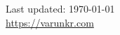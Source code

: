 \documentclass[10pt, letterpaper]{article}
\def\footerlink{https://varunkr.com}
\begin{document}
\begin{comment}


\section*{References}
\begin{tabular}{cc}
\hline
\href{https://web.stanford.edu/~jhain/index.htm}{Jens Hainmueller} &
\href{https://stanford.edu/~avidit/} {Avidit Acharya}\\
Professor of Political Science and Political Economy &
Associate Professor of Political Science and Political Economy \\
Stanford & Stanford \\
\href{jhain@stanford.edu}{jhain@stanford.edu} &
\href{avidit@stanford.edu}{avidit@stanford.edu} \\
\hline \\
\href{https://justingrimmer.org/}{Justin Grimmer} &
\href{http://web.stanford.edu/~swager/index.html}{Stefan Wager}\\
Professor of Political Science &
Associate Professor of OIT and Statistics\\
Stanford & Stanford GSB \\
\href{jgrimmer@stanford.edu}{jgrimmer@stanford.edu} &
\href{swager@stanford.edu}{swager@stanford.edu} \\
\hline \\
\end{tabular}
\end{comment}
\begin{center}
  \begin{footnotesize}
    Last updated: \today \\
    \href{\footerlink}{\footerlink}
  \end{footnotesize}
\end{center}
\end{document}
